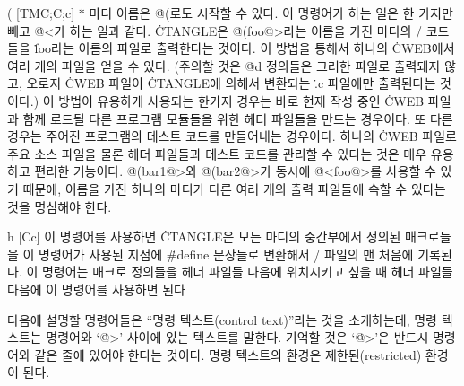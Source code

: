 \@( [TM\to C;\;C;\;c] $*$ 마디 이름은 \.{@(}로도 시작할 수 있다. 이
명령어가 하는 일은 한 가지만 빼고 \.{@<}가 하는 일과 같다.
\.{CTANGLE}은 \.{@(foo@>}라는 이름을 가진 마디의 \CEE/ 코드들을
\.{foo}라는 이름의 파일로 출력한다는 것이다. 이 방법을 통해서 하나의
\.{CWEB}에서 여러 개의 파일을 얻을 수 있다. (주의할 것은 \.{@d}
정의들은 그러한 파일로 출력돼지 않고, 오로지 \.{CWEB} 파일이
\.{CTANGLE}에 의해서 변환되는 \.{.c} 파일에만 출력된다는 것이다.) 이
방법이 유용하게 사용되는 한가지 경우는 바로 현재 작성 중인 \.{CWEB} 파일과
함께 로드될 다른 프로그램 모듈들을 위한 헤더 파일들을 만드는 경우이다.
또 다른 경우는 주어진 프로그램의 테스트 코드를 만들어내는
경우이다. 하나의 \.{CWEB} 파일로 주요 소스 파일을 물론 헤더 파일들과 테스트
코드를 관리할 수 있다는 것은 매우 유용하고 편리한 기능이다.  
\.{@(bar1@>}와 \.{@(bar2@>}가 동시에 \.{@<foo@>}를 사용할 수 있기 때문에,
이름을 가진 하나의 마디가 다른 여러 개의 출력 파일들에 속할 수 있다는 것을
명심해야 한다.   

\@{h} [Cc] 이 명령어를 사용하면 \.{CTANGLE}은 모든 마디의 중간부에서
정의된 매크로들을 이 명령어가 사용된 지점에 \.{\#define} 문장들로
변환해서 \CEE/ 파일의 맨 처음에 기록된다. 이
명령어는 매크로 정의들을 헤더 파일들 다음에 위치시키고 싶을 때 헤더
파일들 다음에 이 명령어를 사용하면 된다

\subsec
다음에 설명할 명령어들은 ``명령 텍스트(control text)''라는 것을
소개하는데, 명령 텍스트는 
명령어와 `\.{@>}' 사이에 있는 텍스트를 말한다. 기억할 것은
`\.{@>}'은 반드시 명령어와 같은 줄에 있어야 한다는 것이다. 
명령 텍스트의 환경은 제한된(restricted) 환경이 된다. 

